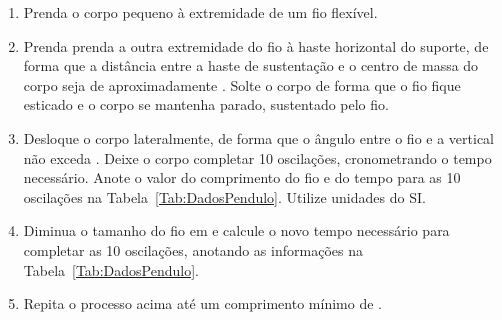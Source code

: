 \begin{enumerate}
	\item Prenda o corpo pequeno à extremidade de um fio flexível.
	\item Prenda prenda a outra extremidade do fio à haste horizontal do suporte, de forma que a distância entre a haste de sustentação e o centro de massa do corpo seja de aproximadamente . Solte o corpo de forma que o fio fique esticado e o corpo se mantenha parado, sustentado pelo fio.
	\item Desloque o corpo lateralmente, de forma que o ângulo entre o fio e a vertical não exceda . Deixe o corpo completar 10 oscilações, cronometrando o tempo necessário. Anote o valor do comprimento do fio e do tempo para as 10 oscilações na Tabela~\ref{Tab:DadosPendulo}. Utilize unidades do SI.
	\item Diminua o tamanho do fio em  e calcule o novo tempo necessário para completar as 10 oscilações, anotando as informações na Tabela~\ref{Tab:DadosPendulo}.
	\item Repita o processo acima até um comprimento mínimo de .
\end{enumerate}


\cleardoublepage


\vspace{15mm}

\begin{fullwidth}
\noindent{}
\vspace{5mm}

\noindent{}

\noindent{}

\noindent{}

\noindent{}

\noindent{}
\end{fullwidth}

